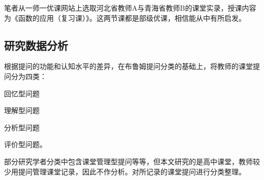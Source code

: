 笔者从一师一优课网站上选取河北省教师A与青海省教师B的课堂实录，授课内容为《函数的应用（复习课）》。这两节课都是部级优课，相信能从中有所启发。


\subsection{研究数据分析}

根据提问的功能和认知水平的差异，在布鲁姆提问分类的基础上，将教师的课堂提问分为四类：
\begin{enumerate*}
  \item 回忆型问题
  \item 理解型问题
  \item 分析型问题
  \item 评价型问题。
\end{enumerate*}
部分研究学者分类中包含课堂管理型提问等等，但本文研究的是高中课堂，教师较少用提问管理课堂记录，因此不作分析。对所记录的课堂提问进行分类整理。